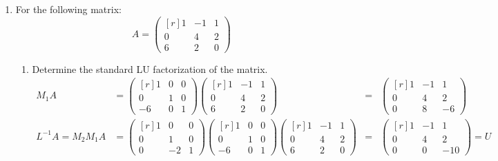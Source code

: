 \documentclass[11pt]{article}
\begin{document}
\begin{enumerate}
	\item For the following matrix:
	      \[A =
		      \begin{pmatrix*}[r]
			      1 & -1 & 1 \\
			      0 & 4  & 2 \\
			      6 & 2  & 0
		      \end{pmatrix*}
	      \]
	      \begin{enumerate}
		      \item Determine the standard LU factorization of the matrix.
		            \begin{align*}
			            M_1 A                & =
			            \begin{pmatrix*}[r]
				            1  & 0 & 0 \\
				            0  & 1 & 0 \\
				            -6 & 0 & 1
			            \end{pmatrix*}
			            \begin{pmatrix*}[r]
				            1 & -1 & 1 \\
				            0 & 4  & 2 \\
				            6 & 2  & 0
			            \end{pmatrix*}
			                                 & = &
			            \begin{pmatrix*}[r]
				            1 & -1 & 1  \\
				            0 & 4  & 2  \\
				            0 & 8  & -6
			            \end{pmatrix*}         \\
			            L^{-1} A = M_2 M_1 A & =
			            \begin{pmatrix*}[r]
				            1 & 0  & 0 \\
				            0 & 1  & 0 \\
				            0 & -2 & 1
			            \end{pmatrix*}
			            \begin{pmatrix*}[r]
				            1  & 0 & 0 \\
				            0  & 1 & 0 \\
				            -6 & 0 & 1
			            \end{pmatrix*}
			            \begin{pmatrix*}[r]
				            1 & -1 & 1 \\
				            0 & 4  & 2 \\
				            6 & 2  & 0
			            \end{pmatrix*}
			                                 & = &
			            \begin{pmatrix*}[r]
				            1 & -1 & 1   \\
				            0 & 4  & 2   \\
				            0 & 0  & -10
			            \end{pmatrix*}
			            = U
		            \end{align*}


\end{enumerate}
\end{enumerate}
\end{document}
